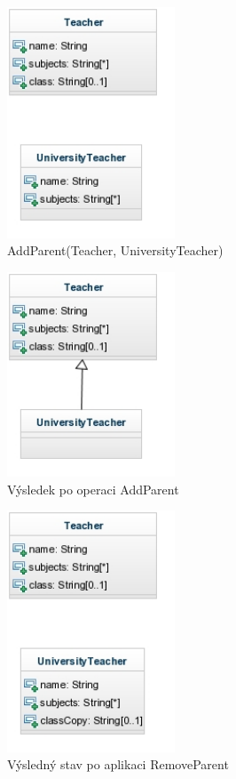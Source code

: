 \documentclass[11pt,twoside,a4paper]{book}
\begin{document}
\begin{figure}[ht]
\begin{center}
\includegraphics[width=5cm]{figures/teacher_university_teacher}
\caption{AddParent(Teacher, UniversityTeacher)}
\label{fig:add_parent}
\end{center}
\end{figure}

\begin{figure}[ht]
\begin{center}
\includegraphics[width=5cm]{figures/teacher_university_teacher_remove}
\caption{Výsledek po operaci AddParent}
\label{fig:remove_parent}
\end{center}
\end{figure}

\begin{figure}[ht]
\begin{center}
\includegraphics[width=5cm]{figures/teacher_university_teacher_remove_inversion}
\caption{Výsledný stav po aplikaci RemoveParent}
\label{fig:remove_parent_apl}
\end{center}
\end{figure}
\end{document}
